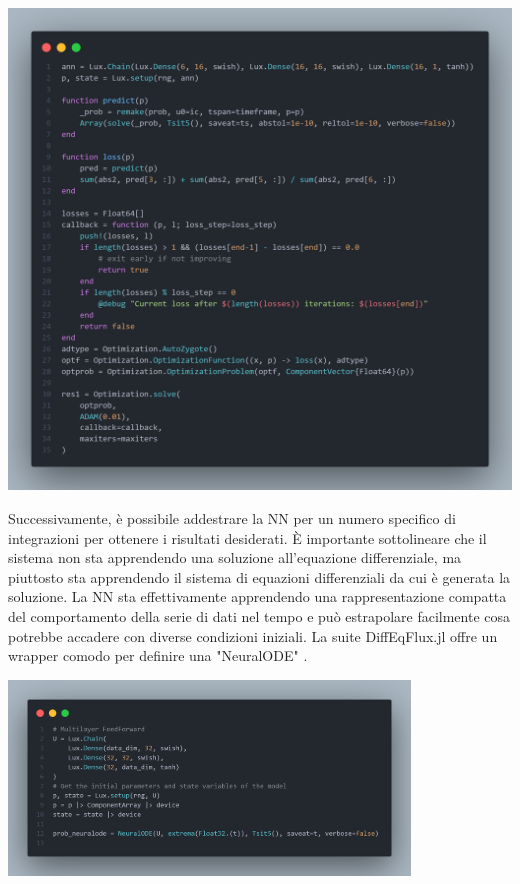 \begin{minipage}{\linewidth}
    \centering
    \includegraphics[width=\textwidth]{img/fann.png}
    \label{fig:NN_Julia_example}
\end{minipage}

Successivamente, è possibile addestrare la NN per un numero specifico di 
integrazioni per ottenere i risultati desiderati. È importante 
sottolineare che il sistema non sta apprendendo una soluzione 
all'equazione differenziale, ma piuttosto sta apprendendo il sistema di 
equazioni differenziali da cui è generata la soluzione. La NN sta 
effettivamente apprendendo una rappresentazione compatta del comportamento 
della serie di dati nel tempo e può estrapolare facilmente cosa 
potrebbe accadere con diverse condizioni iniziali. La suite DiffEqFlux.jl 
offre un wrapper comodo per definire una "NeuralODE" \cite{rackauckas2019diffeqflux}.

\begin{minipage}{\linewidth}
    \centering
    \includegraphics[width=0.8\textwidth]{img/fneuralode.png}
    \label{fig:NeuralODE_Julia_example}
\end{minipage}

